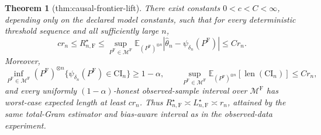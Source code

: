 \documentclass{article}
\newtheorem{theorem}{Theorem}
\begin{document}
\begin{theorem}[thm:causal-frontier-lift]\label{thm:causal-frontier-lift}
There exist constants \(0<c<C<\infty\), depending only on the declared model constants, such that for every deterministic threshold sequence and all sufficiently large \(n\),
\[
 c r_n\leq R_{n,\mathrm F}^\star
 \leq\sup_{P^{\mathrm F}\in\mathcal M^{\mathrm F}}
 \mathbb E_{(P^{\mathrm F})^{\otimes n}}|\widehat\theta_n-\psi_{\delta_n}(P^{\mathrm F})|
 \leq C r_n.
\]
Moreover,
\[
 \inf_{P^{\mathrm F}\in\mathcal M^{\mathrm F}}(P^{\mathrm F})^{\otimes n}
 \{\psi_{\delta_n}(P^{\mathrm F})\in\mathrm{CI}_n\}\geq1-\alpha,
 \qquad
 \sup_{P^{\mathrm F}\in\mathcal M^{\mathrm F}}
 \mathbb E_{(P^{\mathrm F})^{\otimes n}}[\operatorname{len}(\mathrm{CI}_n)]\leq Cr_n,
\]
and every uniformly \((1-\alpha)\)-honest observed-sample interval over \(\mathcal M^{\mathrm F}\) has worst-case expected length at least \(cr_n\).  Thus \(R_{n,\mathrm F}^\star\asymp L_{n,\mathrm F}^\star\asymp r_n\), attained by the same total-Gram estimator and bias-aware interval as in the observed-data experiment.
\end{theorem}
\end{document}
